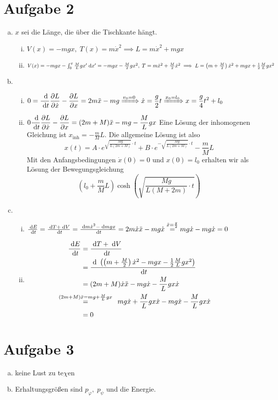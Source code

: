 \documentclass{article}
\theoremstyle{definition}
\newcommand{\Lagrange}[1]{\frac{\d }{\d t}\frac{\partial L }{\partial \dot #1} - \frac{\partial L}{\partial #1}}
\let\oldstackrel\stackrel
\renewcommand{\stackrel}[2]{%
    \oldstackrel{\mathclap{#1}}{#2}
}%
\begin{document}
\section*{Aufgabe 2}
\begin{enumerate}[(a)]
    \item $x$ sei die Länge, die über die Tischkante hängt.
    \begin{enumerate}[(i)]
        \item $V(x) = -mgx,\; T(x) = m\dot x^2\implies L = m\dot x^2 + mgx$
        \item $V(x) = -mgx - \int_0^x\frac{M}{L}gx'\d x' = -mgx - \frac{M}{2}gx^2,\; T = m\dot x^2 + \frac{M}{2}\dot x^2\implies L=\left(m + \frac{M}{2}\right)\dot x^2 + mgx + \frac{1}{2}\frac{M}{L}gx^2$
    \end{enumerate}
    \item \begin{enumerate}[(i)]
        \item $\displaystyle 0 = \Lagrange{x} = 2m\ddot x - mg \xRightarrow{v_0 = 0} \dot x = \frac{g}{2}t\xRightarrow{x_0 = l_0} x = \frac{g}{4}t^2 + l_0$
        \item $\displaystyle 0 \Lagrange{x} = (2m + M)\ddot x - mg - \frac{M}{L}gx$
        Eine Lösung der inhomogenen Gleichung ist $x_{\text{inh}} = - \frac{m}{M}L$.
        Die allgemeine Lösung ist also $$x(t) = A\cdot e^{\sqrt{\frac{Mg}{L(2m + M)}}\cdot t} + B \cdot e^{-\sqrt{\frac{Mg}{L(2m + M)}}\cdot t} - \frac{m}{M}L$$
        Mit den Anfangsbedingungen $\dot x(0) = 0$ und $x(0) = l_0$ erhalten wir als Lösung der Bewegungsgleichung
        $$\left(l_0 + \frac{m}{M}L\right)\cosh\left(\sqrt{\frac{Mg}{L(M+ 2m)}\cdot t}\right)$$
    \end{enumerate}
    \item \begin{enumerate}[(i)]
        \item $\frac{\d E}{\d t} = \frac{\d T + \d V}{\d t} = \frac{\d m\dot x^2 - \d m gx}{\d t} = 2m\dot x\ddot x - mg\dot x \overset{\ddot x = \frac{g}{2}}{=} m g\dot x - m g\dot x = 0$
        \item \begin{align*}
            \frac{\d E}{\d t} &= \frac{\d T + \d V}{\d t}\\
            &= \frac{\d \ \left(\left(m + \frac{M}{2}\right)\dot x^2 - mgx - \frac{1}{2} \frac{M}{L}gx^2\right)}{\d t}\\
            &= (2m + M)\dot x\ddot x - mg\dot x - \frac{M}{L}gx\dot x\\
            &\stackrel{(2m + M)\ddot x = mg + \frac{M}{L}gx}{=}\qquad \qquad m g\dot x + \frac{M}{L}gx\dot x - mg\dot x - \frac{M}{L}gx\dot x\\
            &= 0
        \end{align*}
    \end{enumerate}
\end{enumerate}
\section*{Aufgabe 3}
\begin{enumerate}[(a)]
    \item keine Lust zu te$\chi$en
    \item Erhaltungsgrößen sind $p_\varphi,\; p_\psi$ und die Energie.
\end{enumerate}
\end{document}
